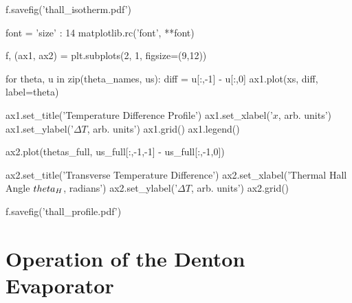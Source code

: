 \documentclass{thesis-umich}
\begin{document}
\begin{singlespace}
\begin{code}
f.savefig('thall_isotherm.pdf')

font = {'size'   : 14}
matplotlib.rc('font', **font)

f, (ax1, ax2) = plt.subplots(2, 1, figsize=(9,12))

for theta, u in zip(theta_names, us):
    diff = u[:,-1] - u[:,0]
    ax1.plot(xs, diff, label=theta)

ax1.set_title('Temperature Difference Profile')
ax1.set_xlabel('$x$, arb. units')
ax1.set_ylabel('$\Delta T$, arb. units')
ax1.grid()
ax1.legend()

ax2.plot(thetas_full, us_full[:,-1,-1] - us_full[:,-1,0])

ax2.set_title('Transverse Temperature Difference')
ax2.set_xlabel('Thermal Hall Angle $\\theta_H$, radians')
ax2.set_ylabel('$\Delta T$, arb. units')
ax2.grid()

f.savefig('thall_profile.pdf')

\end{code}
\end{singlespace}

\chapter{Operation of the Denton Evaporator}



\end{document}
